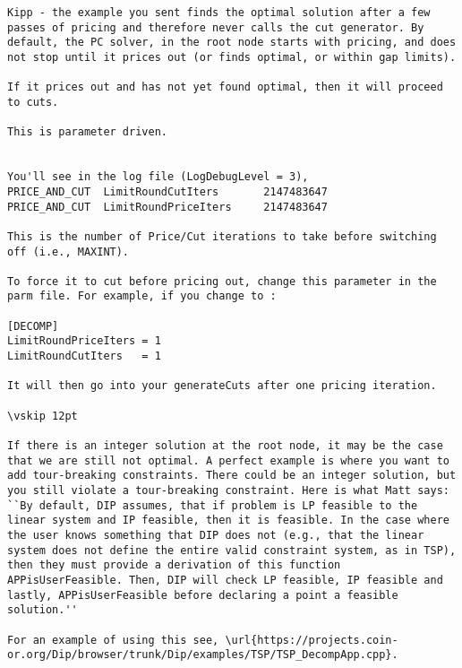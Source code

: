 \begin{verbatim}
Kipp - the example you sent finds the optimal solution after a few passes of pricing and therefore never calls the cut generator. By default, the PC solver, in the root node starts with pricing, and does not stop until it prices out (or finds optimal, or within gap limits).

If it prices out and has not yet found optimal, then it will proceed to cuts.

This is parameter driven.


You'll see in the log file (LogDebugLevel = 3),
PRICE_AND_CUT  LimitRoundCutIters       2147483647
PRICE_AND_CUT  LimitRoundPriceIters     2147483647

This is the number of Price/Cut iterations to take before switching off (i.e., MAXINT).

To force it to cut before pricing out, change this parameter in the parm file. For example, if you change to :

[DECOMP]
LimitRoundPriceIters = 1
LimitRoundCutIters   = 1

It will then go into your generateCuts after one pricing iteration.

\vskip 12pt

If there is an integer solution at the root node, it may be the case that we are still not optimal. A perfect example is where you want to add tour-breaking constraints. There could be an integer solution, but you still violate a tour-breaking constraint. Here is what Matt says:
``By default, DIP assumes, that if problem is LP feasible to the linear system and IP feasible, then it is feasible. In the case where the user knows something that DIP does not (e.g., that the linear system does not define the entire valid constraint system, as in TSP), then they must provide a derivation of this function APPisUserFeasible. Then, DIP will check LP feasible, IP feasible and lastly, APPisUserFeasible before declaring a point a feasible solution.''

For an example of using this see, \url{https://projects.coin-or.org/Dip/browser/trunk/Dip/examples/TSP/TSP_DecompApp.cpp}.

\end{verbatim}
